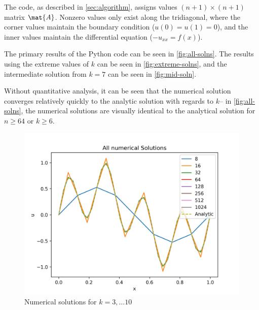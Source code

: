 \documentclass{template}
\begin{document}
The code, as described in \autoref{sec:algorithm}, assigns values $(n+1)\times(n+1)$ matrix $\mat{A}$. Nonzero values only exist along the tridiagonal, where the corner values maintain the boundary condition ($u(0) = u(1) = 0$), and the inner values maintain the differential equation ($-u_{xx} = f(x)$).

The primary results of the Python code can be seen in \autoref{fig:all-solns}. The results using the extreme values of $k$ can be seen in \autoref{fig:extreme-solns}, and the intermediate solution from $k=7$ can be seen in \autoref{fig:mid-soln}.

Without quantitative analysis, it can be seen that the numerical solution converges relatively quickly to the analytic solution with regards to $k$-- in \autoref{fig:all-solns}, the numerical solutions are visually identical to the analytical solution for $n\geq64$ or $k\geq6$. 

\begin{figure}
    \centering
    \includegraphics[width=0.75\linewidth]{all_num_solns.png}
    \caption{Numerical solutions for $k=3,\dots10$}
    \label{fig:all-solns}
\end{figure}
\end{document}
